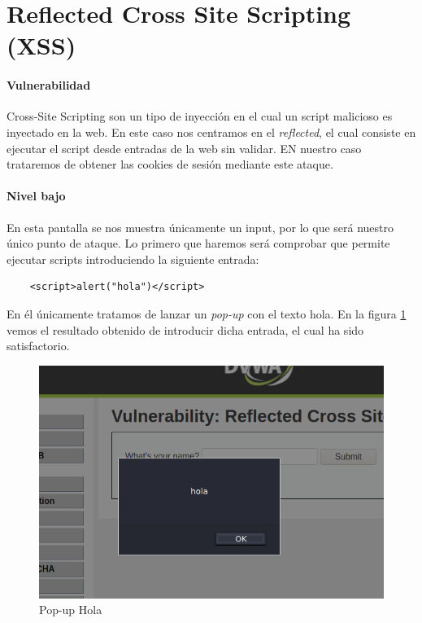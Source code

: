 \section{Reflected Cross Site Scripting (XSS)}
\paragraph{Vulnerabilidad} Cross-Site Scripting son un tipo de inyección en el cual un
script malicioso es inyectado en la web. En este caso nos centramos en el {\it reflected}, 
el cual consiste en ejecutar el script desde entradas de la web sin validar. EN nuestro caso 
trataremos de obtener las cookies de sesión mediante este ataque.
\paragraph{Nivel bajo} En esta pantalla se nos muestra únicamente un input,
por lo que será nuestro único punto de ataque. Lo primero que haremos será comprobar que permite ejecutar
scripts introduciendo la siguiente entrada: 
\begin{lstlisting}
    <script>alert("hola")</script>
\end{lstlisting}
En él únicamente tratamos de lanzar un {\it pop-up} con el texto hola.
En la figura \ref{fig:hola} vemos el resultado obtenido de introducir dicha entrada, el cual
 ha sido satisfactorio.
\begin{figure}[ht!]
    \centering
    \includegraphics[width=14cm]{img/xss/hola.png}
    \caption{Pop-up Hola}
    \label{fig:hola}
\end{figure}

